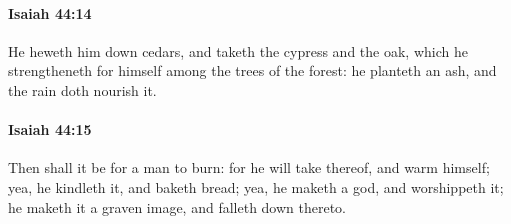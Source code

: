 		\paragraph{Isaiah 44:14} %
			\label{ISAIAH-44-14}

			He heweth him down cedars, and taketh the cypress and the oak, which he strengtheneth for himself among the trees of the forest: he planteth an ash, and the rain doth nourish it.


		\paragraph{Isaiah 44:15} %
			\label{ISAIAH-44-15}

			Then shall it be for a man to burn: for he will take thereof, and warm himself; yea, he kindleth it, and baketh bread; yea, he maketh a god, and worshippeth it; he maketh it a graven image, and falleth down thereto.

